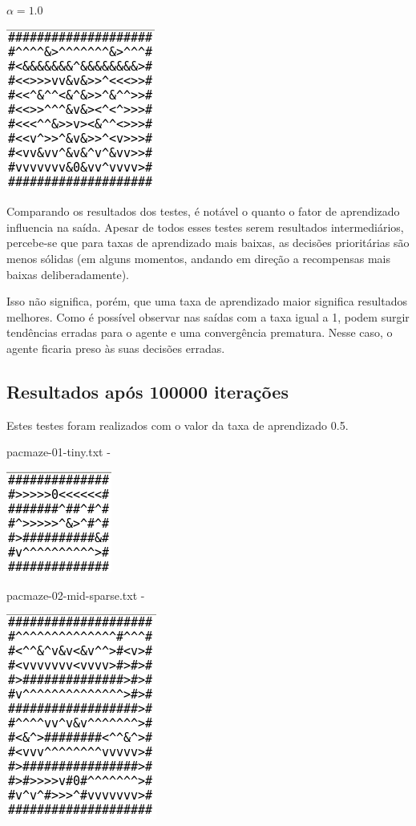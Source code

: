 \documentclass[11pt]{article}
\begin{document}
$\alpha = 1.0$

\includegraphics[scale=.5]{tst3-10.png}

Comparando os resultados dos testes, é notável o quanto o fator de aprendizado influencia na saída. Apesar de todos esses testes serem resultados intermediários, percebe-se que para taxas de aprendizado mais baixas, as decisões prioritárias são menos sólidas (em alguns momentos, andando em direção a recompensas mais baixas deliberadamente).

Isso não significa, porém, que uma taxa de aprendizado maior significa resultados melhores. Como é possível observar nas saídas com a taxa igual a 1, podem surgir tendências erradas para o agente e uma convergência prematura. Nesse caso, o agente ficaria preso às suas decisões erradas.

\subsection{Resultados após 100000 iterações}

Estes testes foram realizados com o valor da taxa de aprendizado 0.5.

pacmaze-01-tiny.txt - 

\includegraphics[scale=.5]{tst1-100k.png}

pacmaze-02-mid-sparse.txt -

\includegraphics[scale=.5]{tst2-100k.png}
\end{document}
